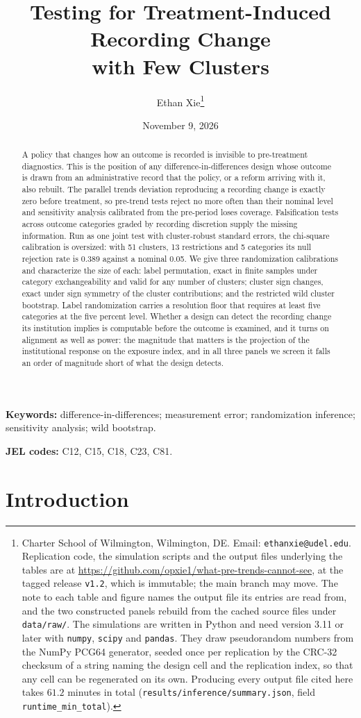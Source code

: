 \documentclass[12pt]{article}
\title{Testing for Treatment-Induced Recording Change\\[2pt]
with Few Clusters}
\author{Ethan Xie\thanks{Charter School of Wilmington, Wilmington, DE.
Email: \texttt{ethanxie@udel.edu}. Replication code, the simulation scripts and
the output files underlying the tables are at
\url{https://github.com/opxie1/what-pre-trends-cannot-see},
at the tagged release \texttt{v1.2}, which is immutable; the main
branch may move. The note to each table and figure names the
output file its entries are read from, and the two constructed panels
rebuild from the cached source files under \texttt{data/raw/}. The simulations are written in Python and need
version 3.11 or later with \texttt{numpy}, \texttt{scipy} and \texttt{pandas}.
They draw pseudorandom numbers from the NumPy PCG64 generator, seeded once per
replication by the CRC-32 checksum of a string naming the design cell and the
replication index, so that any cell can be regenerated on its own. Producing
every output file cited here takes $61.2$ minutes in total
(\texttt{results/inference/summary.json}, field
\texttt{runtime\_min\_total}).}}
\date{November 9, 2026}
\theoremstyle{definition}
\numberwithin{equation}{section}
\begin{document}
\maketitle

\begin{abstract}
\noindent
A policy that changes how an outcome is recorded is invisible to pre-treatment
diagnostics. This is the position of any difference-in-differences design whose
outcome is drawn from an administrative record that the policy, or a reform
arriving with it, also rebuilt. The parallel trends deviation reproducing a recording change is
exactly zero before treatment, so pre-trend tests reject no more often than
their nominal level and sensitivity analysis calibrated from the pre-period loses coverage. Falsification tests across outcome categories graded by
recording discretion supply the missing information. Run as one joint test with
cluster-robust standard errors, the chi-square calibration is oversized: with
51 clusters, 13 restrictions and 5 categories its null rejection rate is 0.389
against a nominal 0.05. We give three randomization calibrations and
characterize the size of each: label permutation, exact in finite samples under
category exchangeability and valid for any number of clusters; cluster sign
changes, exact under sign symmetry of the cluster contributions; and the
restricted wild cluster bootstrap. Label randomization carries a resolution
floor that requires at least five categories at the five percent level. Whether
a design can detect the recording change its institution implies is computable
before the outcome is examined, and it turns on alignment as well as power: the
magnitude that matters is the projection of the institutional response on the
exposure index, and in all three panels we screen it falls an order of magnitude
short of what the design detects.
\end{abstract}

\smallskip
\noindent\textbf{Keywords:} difference-in-differences; measurement error; randomization inference; sensitivity analysis; wild bootstrap.


\smallskip
\noindent\textbf{JEL codes:} C12, C15, C18, C23, C81.

\newpage
\doublespacing

\section{Introduction}
\label{sec:intro}
\end{document}
